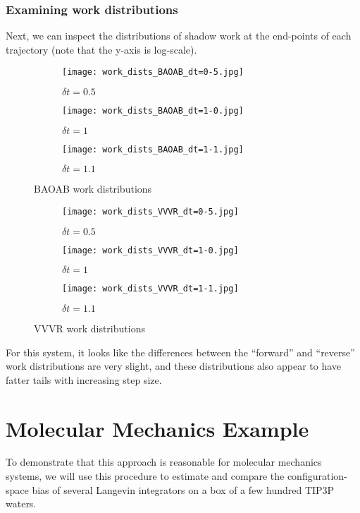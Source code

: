 \documentclass[11pt]{article}
\begin{document}
\subsubsection{Examining work distributions}
Next, we can inspect the distributions of shadow work at the end-points of each trajectory (note that the y-axis is log-scale).
\begin{figure}[h] %
    \centering
    \begin{subfigure}[b]{0.3\textwidth}
        \texttt{[image: work\_dists\_BAOAB\_dt=0-5.jpg]}
        \caption{$\delta t = 0.5$}
    \end{subfigure}
    \begin{subfigure}[b]{0.3\textwidth}
        \texttt{[image: work\_dists\_BAOAB\_dt=1-0.jpg]}
        \caption{$\delta t = 1$}
    \end{subfigure}
    \begin{subfigure}[b]{0.3\textwidth}
        \texttt{[image: work\_dists\_BAOAB\_dt=1-1.jpg]}
        \caption{$\delta t = 1.1$}
    \end{subfigure}
    \caption{BAOAB work distributions}
\end{figure}
\begin{figure}[h] %
    \centering
    \begin{subfigure}[b]{0.3\textwidth}
        \texttt{[image: work\_dists\_VVVR\_dt=0-5.jpg]}
        \caption{$\delta t = 0.5$}
    \end{subfigure}
    \begin{subfigure}[b]{0.3\textwidth}
        \texttt{[image: work\_dists\_VVVR\_dt=1-0.jpg]}
        \caption{$\delta t = 1$}
    \end{subfigure}
    \begin{subfigure}[b]{0.3\textwidth}
        \texttt{[image: work\_dists\_VVVR\_dt=1-1.jpg]}
        \caption{$\delta t = 1.1$}
    \end{subfigure}
    \caption{VVVR work distributions}
\end{figure}

For this system, it looks like the differences between the ``forward'' and ``reverse'' work distributions are very slight, and these distributions also appear to have fatter tails with increasing step size.


\section{Molecular Mechanics Example}
To demonstrate that this approach is reasonable for molecular mechanics systems, we will use this procedure to estimate and compare the configuration-space bias of several Langevin integrators on a box of a few hundred TIP3P waters.
\end{document}
